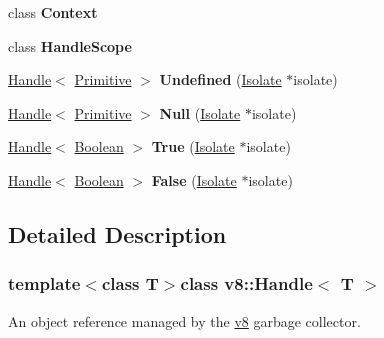 \begin{DoxyCompactItemize}
\item 
\hypertarget{classv8_1_1_handle_ac26c806e60ca4a0547680edb68f6e39b}{}class {\bfseries Context}\label{classv8_1_1_handle_ac26c806e60ca4a0547680edb68f6e39b}

\item 
\hypertarget{classv8_1_1_handle_a5f127e488db492b05c8542cec0b880b7}{}class {\bfseries Handle\+Scope}\label{classv8_1_1_handle_a5f127e488db492b05c8542cec0b880b7}

\item 
\hypertarget{classv8_1_1_handle_a54e0b3d94c2292e9f7d4fc1618ecfdd6}{}\hyperlink{classv8_1_1_handle}{Handle}$<$ \hyperlink{classv8_1_1_primitive}{Primitive} $>$ {\bfseries Undefined} (\hyperlink{classv8_1_1_isolate}{Isolate} $\ast$isolate)\label{classv8_1_1_handle_a54e0b3d94c2292e9f7d4fc1618ecfdd6}

\item 
\hypertarget{classv8_1_1_handle_a495be557de6f0ea3848a2e8fc6505577}{}\hyperlink{classv8_1_1_handle}{Handle}$<$ \hyperlink{classv8_1_1_primitive}{Primitive} $>$ {\bfseries Null} (\hyperlink{classv8_1_1_isolate}{Isolate} $\ast$isolate)\label{classv8_1_1_handle_a495be557de6f0ea3848a2e8fc6505577}

\item 
\hypertarget{classv8_1_1_handle_a29e5558f47ee7c44b54dc3c20eaceb32}{}\hyperlink{classv8_1_1_handle}{Handle}$<$ \hyperlink{classv8_1_1_boolean}{Boolean} $>$ {\bfseries True} (\hyperlink{classv8_1_1_isolate}{Isolate} $\ast$isolate)\label{classv8_1_1_handle_a29e5558f47ee7c44b54dc3c20eaceb32}

\item 
\hypertarget{classv8_1_1_handle_af328581ad265dc321eb55a587708eedc}{}\hyperlink{classv8_1_1_handle}{Handle}$<$ \hyperlink{classv8_1_1_boolean}{Boolean} $>$ {\bfseries False} (\hyperlink{classv8_1_1_isolate}{Isolate} $\ast$isolate)\label{classv8_1_1_handle_af328581ad265dc321eb55a587708eedc}

\end{DoxyCompactItemize}


\subsection{Detailed Description}
\subsubsection*{template$<$class T$>$class v8\+::\+Handle$<$ T $>$}

An object reference managed by the \hyperlink{namespacev8}{v8} garbage collector.

